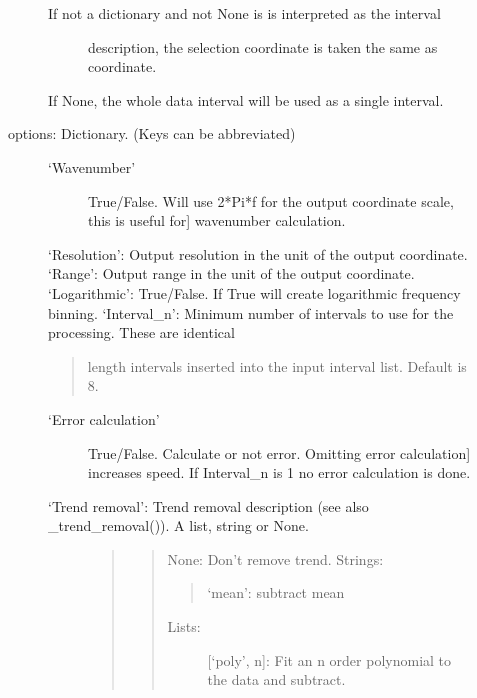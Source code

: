 \documentclass[letterpaper,10pt,english]{sphinxmanual}
\begin{document}
\begin{fulllineitems}
\begin{fulllineitems}
\begin{description}
\begin{description}
\begin{description}
\item[{If not a dictionary and not None is is interpreted as the interval}] \leavevmode
description, the selection coordinate is taken the same as
coordinate.

\end{description}

If None, the whole data interval will be used as a single interval.

\item[{options: Dictionary. (Keys can be abbreviated)}] \leavevmode\begin{description}
\item[{‘Wavenumber’}] \leavevmode{[}True/False. Will use 2*Pi*f for the output coordinate scale, this is useful for{]}
wavenumber calculation.

\end{description}

‘Resolution’: Output resolution in the unit of the output coordinate.
‘Range’: Output range in the unit of the output coordinate.
‘Logarithmic’: True/False. If True will create logarithmic frequency binning.
‘Interval\_n’: Minimum number of intervals to use for the processing. These are identical
\begin{quote}

length intervals inserted into the input interval list. Default is 8.
\end{quote}
\begin{description}
\item[{‘Error calculation’}] \leavevmode{[}True/False. Calculate or not error. Omitting error calculation{]}
increases speed. If Interval\_n is 1 no error calculation is done.

\item[{‘Trend removal’: Trend removal description (see also \_trend\_removal()). A list, string or None.}] \leavevmode\begin{quote}
\begin{quote}

None: Don’t remove trend.
Strings:
\begin{quote}

‘mean’: subtract mean
\end{quote}
\begin{description}
\item[{Lists:}] \leavevmode
{[}‘poly’, n{]}: Fit an n order polynomial to the data and subtract.

\end{description}
\end{quote}


\end{quote}
\end{description}
\end{description}
\end{description}
\end{fulllineitems}
\end{fulllineitems}
\end{document}
